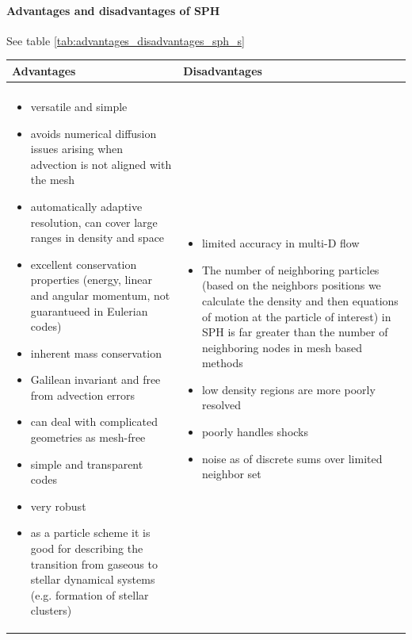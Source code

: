 \paragraph*{Advantages and disadvantages of SPH} See table \ref{tab:advantages_disadvantages_sph_s}

\begin{table}[!htb]
    \centering
    \begin{tabular}{p{}|p{}}
        \textcolor{green1}{Advantages} & \textcolor{red1}{Disadvantages} \\
        \hline \\
        \begin{itemize}
            \item versatile and simple
            \item avoids numerical diffusion issues arising when advection is not aligned with the mesh
            \item automatically adaptive resolution, can cover large ranges in density and space
            \item excellent conservation properties (energy, linear and angular momentum, not guarantueed in Eulerian codes)
            \item inherent mass conservation
            \item Galilean invariant and free from advection errors
            \item can deal with complicated geometries as mesh-free
            \item simple and transparent codes
            \item very robust
            \item as a particle scheme it is good for describing the transition from gaseous to stellar dynamical systems (e.g. formation of stellar clusters)
        \end{itemize} &
        \begin{itemize}
            \item limited accuracy in multi-D flow
            \item The number of neighboring particles (based on the neighbors positions we calculate the density and then equations of motion at the particle of interest) in SPH is far greater than the number of neighboring nodes in mesh based methods
            \item low density regions are more poorly resolved
            \item poorly handles shocks
            \item noise as of discrete sums over limited neighbor set

\end{itemize}
\end{tabular}
\end{table}

